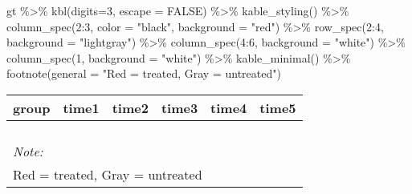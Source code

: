 \documentclass[
]{article}
\newenvironment{Shaded}{\begin{snugshade}}{\end{snugshade}}
\newcommand{\AttributeTok}[1]{\textcolor[rgb]{0.77,0.63,0.00}{#1}}
\newcommand{\ConstantTok}[1]{\textcolor[rgb]{0.00,0.00,0.00}{#1}}
\newcommand{\DecValTok}[1]{\textcolor[rgb]{0.00,0.00,0.81}{#1}}
\newcommand{\FunctionTok}[1]{\textcolor[rgb]{0.00,0.00,0.00}{#1}}
\newcommand{\NormalTok}[1]{#1}
\newcommand{\SpecialCharTok}[1]{\textcolor[rgb]{0.00,0.00,0.00}{#1}}
\newcommand{\StringTok}[1]{\textcolor[rgb]{0.31,0.60,0.02}{#1}}
\begin{document}
\begin{Shaded}
\begin{Highlighting}[]
\NormalTok{gt }\SpecialCharTok{\%\textgreater{}\%}
  \FunctionTok{kbl}\NormalTok{(}\AttributeTok{digits=}\DecValTok{3}\NormalTok{, }\AttributeTok{escape =} \ConstantTok{FALSE}\NormalTok{) }\SpecialCharTok{\%\textgreater{}\%}
  \FunctionTok{kable\_styling}\NormalTok{() }\SpecialCharTok{\%\textgreater{}\%}
  \FunctionTok{column\_spec}\NormalTok{(}\DecValTok{2}\SpecialCharTok{:}\DecValTok{3}\NormalTok{, }\AttributeTok{color =} \StringTok{"black"}\NormalTok{, }\AttributeTok{background =} \StringTok{"red"}\NormalTok{) }\SpecialCharTok{\%\textgreater{}\%}
  \FunctionTok{row\_spec}\NormalTok{(}\DecValTok{2}\SpecialCharTok{:}\DecValTok{4}\NormalTok{, }\AttributeTok{background  =} \StringTok{"lightgray"}\NormalTok{) }\SpecialCharTok{\%\textgreater{}\%}
  \FunctionTok{column\_spec}\NormalTok{(}\DecValTok{4}\SpecialCharTok{:}\DecValTok{6}\NormalTok{, }\AttributeTok{background =} \StringTok{"white"}\NormalTok{) }\SpecialCharTok{\%\textgreater{}\%}
  \FunctionTok{column\_spec}\NormalTok{(}\DecValTok{1}\NormalTok{, }\AttributeTok{background =} \StringTok{"white"}\NormalTok{) }\SpecialCharTok{\%\textgreater{}\%}
  \FunctionTok{kable\_minimal}\NormalTok{() }\SpecialCharTok{\%\textgreater{}\%}
  \FunctionTok{footnote}\NormalTok{(}\AttributeTok{general =} \StringTok{"Red = treated, Gray = untreated"}\NormalTok{)}
\end{Highlighting}
\end{Shaded}

\begin{table}
\centering
\begin{tabular}[t]{>{}r|>{}r|>{}r|>{}r|>{}r|>{}r}
\hline
group & time1 & time2 & time3 & time4 & time5\\
\hline
\cellcolor{white}{2} & \cellcolor{red}{\textcolor{black}{0.631}} & \cellcolor{red}{\textcolor{black}{0.711}} & \cellcolor{white}{0.814} & \cellcolor{white}{0.846} & \cellcolor{white}{0.826}\\
\hline
\cellcolor{white}{3} & \cellcolor{lightgray}{\textcolor{black}{0.678}} & \cellcolor{lightgray}{\textcolor{black}{0.770}} & \cellcolor{white}{0.664} & \cellcolor{white}{0.800} & \cellcolor{white}{0.784}\\
\hline
\cellcolor{white}{4} & \cellcolor{lightgray}{\textcolor{black}{0.778}} & \cellcolor{lightgray}{\textcolor{black}{0.807}} & \cellcolor{white}{0.673} & \cellcolor{white}{0.750} & \cellcolor{white}{0.868}\\
\hline
\cellcolor{white}{5} & \cellcolor{lightgray}{\textcolor{black}{0.854}} & \cellcolor{lightgray}{\textcolor{black}{0.939}} & \cellcolor{white}{0.854} & \cellcolor{white}{0.800} & \cellcolor{white}{0.855}\\
\hline
\multicolumn{6}{l}{\rule{0pt}{1em}\textit{Note: }}\\
\multicolumn{6}{l}{\rule{0pt}{1em}Red = treated, Gray = untreated}\\
\end{tabular}
\end{table}
\end{document}
